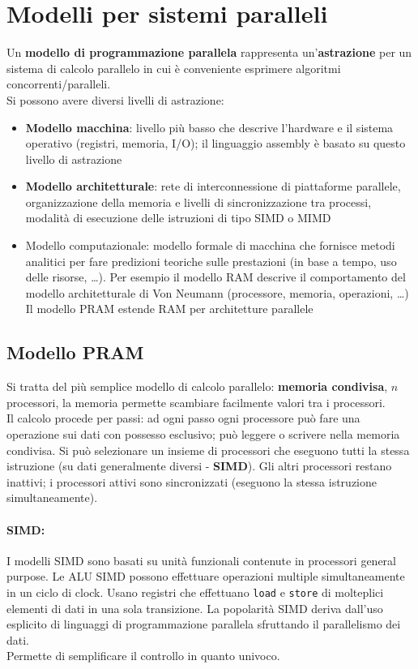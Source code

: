 \section{Modelli per sistemi paralleli}
Un \textbf{modello di programmazione parallela} rappresenta un'\textbf{astrazione} per un sistema di calcolo parallelo in cui è conveniente esprimere algoritmi concorrenti/paralleli. \\

Si possono avere diversi livelli di astrazione: 
\begin{itemize}
	\item \textbf{Modello macchina}: livello più basso che descrive l'hardware e il sistema operativo (registri, memoria, I/O); il linguaggio assembly è basato su questo livello di astrazione
	\item \textbf{Modello architetturale}: rete di interconnessione di piattaforme parallele, organizzazione della memoria e livelli di sincronizzazione tra processi, modalità di esecuzione delle istruzioni di tipo SIMD o MIMD
	\item Modello computazionale: modello formale di macchina che fornisce metodi analitici per fare predizioni teoriche sulle prestazioni (in base a tempo, uso delle risorse, …). Per esempio il modello RAM descrive il comportamento del modello architetturale di Von Neumann (processore, memoria, operazioni, …) Il modello PRAM estende RAM per architetture parallele
\end{itemize}

\subsection{Modello PRAM}
Si tratta del più semplice modello di calcolo parallelo: \textbf{memoria condivisa}, $n$ processori, la memoria permette scambiare facilmente valori tra i processori.\\

Il calcolo procede per passi: ad ogni passo ogni processore può fare una operazione sui dati con possesso esclusivo; può leggere o scrivere nella memoria condivisa. Si può selezionare un insieme di processori che eseguono tutti la stessa istruzione (su dati generalmente diversi - \textbf{SIMD}). Gli altri processori restano inattivi; i processori attivi sono sincronizzati (eseguono la stessa istruzione simultaneamente).\\

\paragraph{SIMD:} I modelli SIMD sono basati su unità funzionali contenute in processori general purpose. Le ALU SIMD possono effettuare operazioni multiple simultaneamente in un ciclo di clock. Usano registri che effettuano \texttt{load} e \texttt{store} di molteplici elementi di dati in una sola transizione. La popolarità SIMD deriva dall'uso esplicito di linguaggi di programmazione parallela sfruttando il parallelismo dei dati.\\
Permette di semplificare il controllo in quanto univoco.\\

